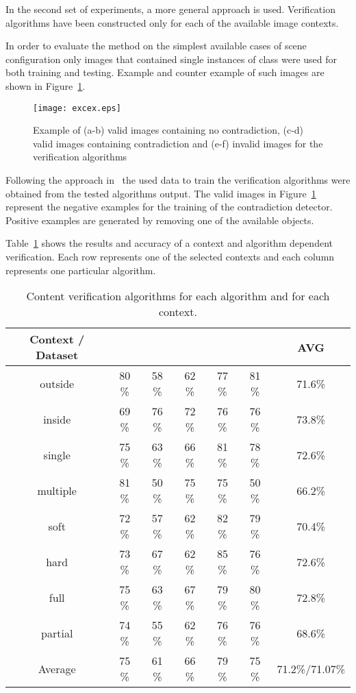 \documentclass[conference]{IEEEtran}
\begin{document}
In the second set of experiments, a more general approach is used. Verification algorithms have been constructed only for each of the available image contexts.

In order to evaluate the method on the simplest available cases of scene configuration only images that contained single instances of class were used for both training and testing. Example and counter example of such images are shown in Figure~\ref{fig:excex}.
\begin{figure}[bht]
	\centering
	\texttt{[image: excex.eps]}
	\caption{\label{fig:excex} Example of (a-b) valid images containing no contradiction, (c-d) valid images containing contradiction and (e-f) invalid images for the verification algorithms}
\end{figure}
Following the approach in~\cite{lukac:15} the used data to train the verification algorithms were obtained from the tested algorithms output. The valid images in Figure~\ref{fig:excex} represent the negative examples for the training of the contradiction detector. Positive examples are generated by removing one of the available objects. 


Table~\ref{tab:verif} shows the results and accuracy of a context and algorithm dependent verification. Each row represents one of the selected contexts and each column represents one particular algorithm. 

\begin{table}[bht]
	\centering
	\caption{\label{tab:verif} Content verification algorithms for each algorithm and for each context.}
	\begin{tabular}{|c|c|c|c|c|c|c|}
		\hline
		Context / Dataset& ~\cite{chen:14}&~\cite{ion:11}&~\cite{ladicky:13}&~\cite{bharath:14}&~\cite{simonyan:15}&AVG\\
		\hline
		outside&80 \%&58 \%&62 \%&77 \%&81 \%&71.6\%\\
		inside&69 \%&76 \%&72 \%&76 \%&76 \%&73.8\%\\
		single&75 \%&63 \%&66 \%&81 \%&78 \%&72.6\%\\
		multiple&81 \%&50 \%&75 \%&75 \%&50 \%&66.2\%\\
		soft&72 \%&57 \%&62 \%&82 \%&79 \%&70.4\%\\
		hard&73 \%&67 \%&62 \%&85 \%&76 \%&72.6\%\\
		full&75 \%&63 \%&67 \%&79 \%&80 \%&72.8\%\\
		partial&74 \%&55 \%&62 \%&76 \%&76 \%&68.6\%\\
		\hline
		Average&75 \%&61 \%&66 \%&79 \%&75 \%&71.2\%/71.07\%\\
		\hline
	\end{tabular}
\end{table}
\end{document}
